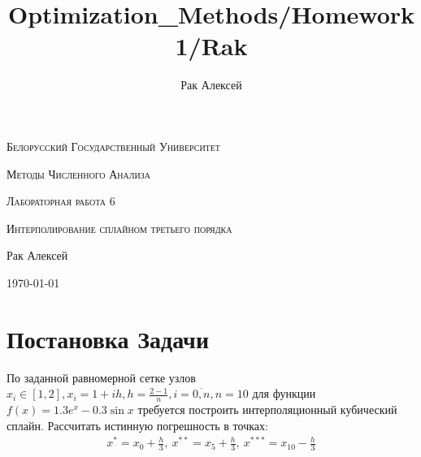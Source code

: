 \documentclass[10pt]{scrartcl}
\begin{document}
\author{Рак Алексей}
\title{Optimization_Methods/Homework1/Rak}
\begin{titlepage}
		\centering
		{\scshape\LARGE Белорусский Государственный Университет \par}
        \vfill
        {\scshape\LARGE Методы Численного Анализа\par}
        \vspace{1cm}
        {\scshape\LARGE Лабораторная работа 6\par}
        \vspace{1cm}
        {\scshape\LARGE Интерполирование сплайном третьего порядка\par}
        \vspace{2cm}
        {\LARGE Рак Алексей\par}
        \vfill
        {\large \today}
\end{titlepage}
\section*{Постановка Задачи}\noindent
По заданной равномерной сетке узлов $x_i \in [1, 2], x_i = 1 + ih, h = \frac{2 - 1}{n}, i = \overline{0, n},
n = 10$ для функции $f(x) = 1.3e^x - 0.3\sin x$ требуется построить интерполяционный кубический сплайн.
Рассчитать истинную погрешность в точках:
\begin{gather*}
x^* = x_0 + \frac{h}{3}, \ x^{**} = x_5 + \frac{h}{3}, \ x^{***} = x_{10} - \frac{h}{3}\\
\end{gather*}
\end{document}
